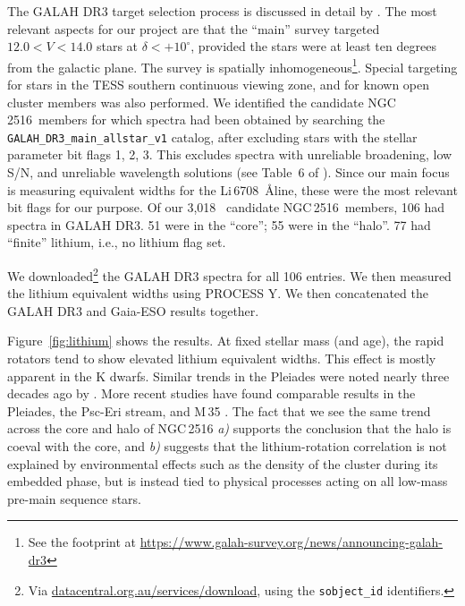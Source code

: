 \documentclass[12pt,twocolumn,tighten]{aastex63}
\newcommand{\cn}{NGC\,2516} %
\newcommand{\nkinematic}{3{,}018\ } %
\begin{document}
The GALAH DR3 target selection process is discussed in detail by
\citet{buder_galah_2020}.  The most relevant aspects for our project
are that the ``main'' survey targeted $12.0<V<14.0$ stars at
$\delta<+10^\circ$, provided the stars were at least ten degrees from the
galactic plane.  The survey is spatially inhomogeneous\footnote{See
the footprint at
\url{https://www.galah-survey.org/news/announcing-galah-dr3}}. Special
targeting for stars in the TESS southern continuous viewing zone, and
for known open cluster members was also performed.  We identified the
candidate \cn\ members
for which spectra had been obtained by searching
the \texttt{GALAH\_DR3\_main\_allstar\_v1} catalog, after excluding
stars with the stellar parameter bit flags 1, 2, 3.  This excludes
spectra with unreliable broadening, low S/N, and unreliable wavelength
solutions (see Table~6 of \citealt{buder_galah_2020}).  Since our main
focus is measuring equivalent widths for the Li\,6708\ \AA line, these
were the most relevant bit flags for our purpose.  Of our \nkinematic
candidate \cn\ members, 106 had spectra in GALAH DR3.  51 were in the
``core''; 55 were in the ``halo''.
77 had ``finite'' lithium, i.e., no lithium flag set.


We downloaded\footnote{Via \url{datacentral.org.au/services/download},
using the \texttt{sobject\_id} identifiers.}
the GALAH DR3 spectra for all 106 entries.
We then measured the lithium equivalent widths using PROCESS Y.
We then concatenated the GALAH DR3 and Gaia-ESO results together.

Figure~\ref{fig:lithium} shows the results.  At fixed stellar mass
(and age), the rapid rotators tend to show elevated lithium equivalent
widths. This effect is mostly apparent in the K dwarfs.  Similar
trends in the Pleiades were noted nearly three decades ago by
\citet{soderblom_evolution_1993}.  More recent studies have found
comparable results in the Pleiades, the Psc-Eri stream, and M\,35
\citep{bouvier_pleiades_lirot_2018,arancibia_2020,jeffries_m35_li_2020}.
The fact that we see the same trend across the core and halo of \cn
{\it a)} supports the conclusion that the halo is coeval with the
core, and {\it b)} suggests that the lithium-rotation correlation is
not explained by environmental effects such as the density of the cluster
during its embedded phase, but is instead tied to physical processes
acting on all low-mass pre-main sequence stars.
\end{document}
